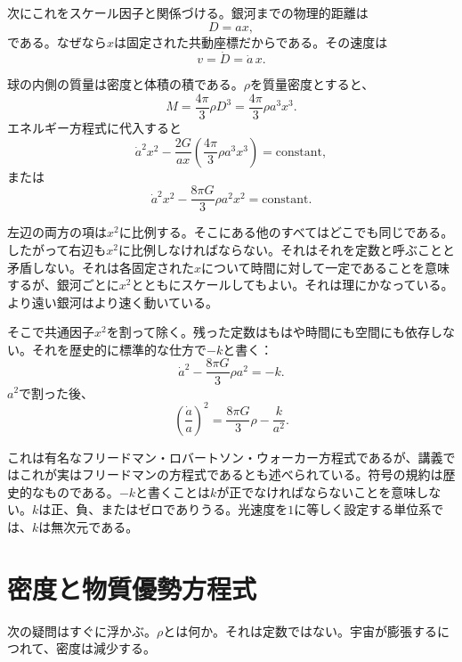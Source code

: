 次にこれをスケール因子と関係づける。銀河までの物理的距離は
\begin{equation}
D=ax,
\end{equation}
である。なぜなら\(x\)は固定された共動座標だからである。その速度は
\begin{equation}
v=\dot D=\dot a\,x.
\end{equation}

球の内側の質量は密度と体積の積である。\(\rho\)を質量密度とすると、
\begin{equation}
M=\frac{4\pi}{3}\rho D^3=\frac{4\pi}{3}\rho a^3x^3.
\end{equation}
エネルギー方程式に代入すると
\begin{equation}
\dot a^2x^2-\frac{2G}{ax}\left(\frac{4\pi}{3}\rho a^3x^3\right)=\text{constant},
\end{equation}
または
\begin{equation}
\dot a^2x^2-\frac{8\pi G}{3}\rho a^2x^2=\text{constant}.
\end{equation}

左辺の両方の項は\(x^2\)に比例する。そこにある他のすべてはどこでも同じである。したがって右辺も\(x^2\)に比例しなければならない。それはそれを定数と呼ぶことと矛盾しない。それは各固定された\(x\)について時間に対して一定であることを意味するが、銀河ごとに\(x^2\)とともにスケールしてもよい。それは理にかなっている。より遠い銀河はより速く動いている。

そこで共通因子\(x^2\)を割って除く。残った定数はもはや時間にも空間にも依存しない。それを歴史的に標準的な仕方で\(-k\)と書く：
\begin{equation}
\dot a^2-\frac{8\pi G}{3}\rho a^2=-k.
\end{equation}
\(a^2\)で割った後、
\begin{equation}
\left(\frac{\dot a}{a}\right)^2=\frac{8\pi G}{3}\rho-\frac{k}{a^2}.
\end{equation}

これは有名なフリードマン・ロバートソン・ウォーカー方程式であるが、講義ではこれが実はフリードマンの方程式であるとも述べられている。符号の規約は歴史的なものである。\(-k\)と書くことは\(k\)が正でなければならないことを意味しない。\(k\)は正、負、またはゼロでありうる。光速度を\(1\)に等しく設定する単位系では、\(k\)は無次元である。

\section{密度と物質優勢方程式}

次の疑問はすぐに浮かぶ。\(\rho\)とは何か。それは定数ではない。宇宙が膨張するにつれて、密度は減少する。

